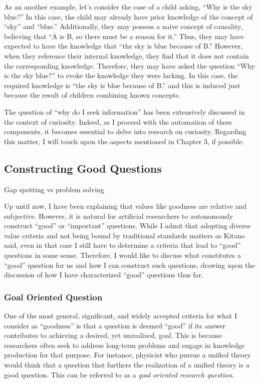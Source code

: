 As an another example, let's consider the case of a child asking, ``Why is the sky blue?'' In this case, the child may already have prior knowledge of the concept of ``sky'' and ``blue.'' Additionally, they may possess a naive concept of causality, believing that ``A is B, so there must be a reason for it.'' Thus, they may have expected to have the knowledge that ``the sky is blue because of B.'' However, when they reference their internal knowledge, they find that it does not contain the corresponding knowledge. Therefore, they may have asked the question ``Why is the sky blue?'' to evoke the knowledge they were lacking. In this case, the required knowledge is ``the sky is blue because of B.'' and this is induced just because the result of children combining known concepts.

The question of ``why do I seek information'' has been extensively discussed in the context of curiosity. Indeed, as I proceed with the automation of these components, it becomes essential to delve into research on curiosity. Regarding this matter, I will touch upon the aspects mentioned in Chapter 3, if possible. 

\subsection{Constructing Good Questions}
Gap spotting vs problem solving \cite{alvesson2013constructing}

Up until now, I have been explaining that values like goodness are relative and subjective. However, it is natural for artificial researchers to autonomously construct ``good'' or ``important'' questions. While I admit that adopting diverse value criteria and not being bound by traditional standards matters as Kitano said, even in that case I still have to determine a criteria that lead to ``good'' questions in some sense. Therefore, I would like to discuss what constitutes a ``good'' question for us and how I can construct such questions, drawing upon the discussion of how I have characterized ``good'' questions thus far.

\subsubsection{Goal Oriented Question}
One of the most general, significant, and widely accepted criteria for what I consider as ``goodness'' is that a question is deemed ``good'' if its answer contributes to achieving a desired, yet unrealized, goal. This is because researchers often seek to address long-term problems and engage in knowledge production for that purpose. For instance, physicist who pursue a unified theory would think that a question that furthers the realization of a unified theory is a good question. This can be referred to as a \textit{goal oriented research question}.

